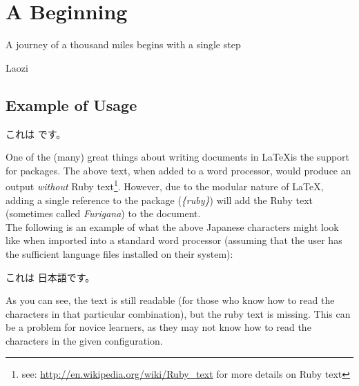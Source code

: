 \chapter{A Beginning}
\epigraph{A journey of a thousand miles begins with a single step}{Laozi}




\section{Example of Usage}
\begin{CJK}{UTF8}{min}
これは  です。\\
\end{CJK}
\indent{}One of the (many) great things about writing documents in \LaTeX is the support for packages. The above text, when added to a word processor, would produce an output \emph{without} Ruby text\footnote{see: \url{http://en.wikipedia.org/wiki/Ruby_text} for more details on Ruby text}. However, due to the modular nature of \LaTeX, adding a single reference to the package (\emph{\{ruby\}}) will add the Ruby text (sometimes called \emph{Furigana}) to the document.\\
\indent{}The following is an example of what the above Japanese characters might look like when imported into a standard word processor (assuming that the user has the sufficient language files installed on their system):\\
\begin{CJK}{UTF8}{min}
\indent{}これは 日本語です。\\
\end{CJK}
\indent{}As you can see, the text is still readable (for those who know how to read the characters in that particular combination), but the ruby text is missing. This can be a problem for novice learners, as they may not know how to read the characters in the given configuration.
